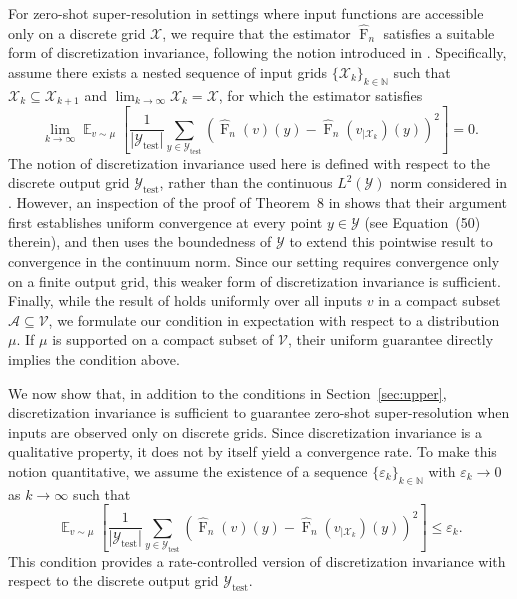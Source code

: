 \documentclass[11pt]{article}
\theoremstyle{plain}
\newcommand{\Acal}{\mathcal{A}}
\newcommand{\Xcal}{\mathcal{X}}
\newcommand{\Ycal}{\mathcal{Y}}
\newcommand{\Vcal}{\mathcal{V}}
\DeclareMathOperator*{\expect}{\mathbb{E}}
\begin{document}
For zero-shot super-resolution in settings where input functions are accessible only on a discrete
grid $\Xcal$, we require that the estimator $\widehat{\operatorname{F}}_n$ satisfies a suitable form
of discretization invariance, following the notion introduced in
\citep{kovachki2021universal}. Specifically, assume there exists a nested sequence of input grids
$\{\Xcal_k\}_{k \in \mathbb{N}}$ such that $\Xcal_k \subseteq \Xcal_{k+1}$ and
$\lim_{k \to \infty} \Xcal_k = \Xcal$, for which the estimator satisfies
\[
\lim_{k \to \infty}
\expect_{v \sim \mu}
\left[
\frac{1}{|\Ycal_{\mathrm{test}}|}
\sum_{y \in \Ycal_{\mathrm{test}}}
\left(
\widehat{\operatorname{F}}_n(v)(y)
-
\widehat{\operatorname{F}}_n\!\left(v_{\mid \Xcal_k}\right)(y)
\right)^2
\right]
=
0.
\]
The notion of discretization invariance used here is defined with respect to the discrete output
grid $\Ycal_{\mathrm{test}}$, rather than the continuous $L^2(\Ycal)$ norm considered in
\citep{kovachki2023neural}. However, an inspection of the proof of Theorem~8 in
\citep{kovachki2023neural} shows that their argument first establishes uniform convergence at every
point $y \in \Ycal$ (see Equation~(50) therein), and then uses the boundedness of $\Ycal$ to extend
this pointwise result to convergence in the continuum norm. Since our setting requires convergence
only on a finite output grid, this weaker form of discretization invariance is sufficient. Finally, while the result of \cite{kovachki2023neural} holds uniformly over all inputs $v$ in a
compact subset $\Acal \subseteq \Vcal$, we formulate our condition in expectation with respect to a
distribution $\mu$. If $\mu$ is supported on a compact subset of $\Vcal$, their uniform guarantee
directly implies the condition above.



We now show that, in addition to the conditions in Section~\ref{sec:upper}, discretization
invariance is sufficient to guarantee zero-shot super-resolution when inputs are observed only on
discrete grids. Since discretization invariance is a qualitative property, it does not by itself
yield a convergence rate. To make this notion quantitative, we assume the existence of a sequence
$\{\varepsilon_k\}_{k \in \mathbb{N}}$ with $\varepsilon_k \to 0$ as $k \to \infty$ such that
\begin{equation}
\label{eq:disc-inv}
\expect_{v \sim \mu}
\left[
\frac{1}{|\Ycal_{\mathrm{test}}|}
\sum_{y \in \Ycal_{\mathrm{test}}}
\left(
\widehat{\operatorname{F}}_n(v)(y)
-
\widehat{\operatorname{F}}_n\!\left(v_{\mid \Xcal_k}\right)(y)
\right)^2
\right]
\le
\varepsilon_k.
\end{equation}
This condition provides a rate-controlled version of discretization invariance with respect to the
discrete output grid $\Ycal_{\mathrm{test}}$.
\end{document}
